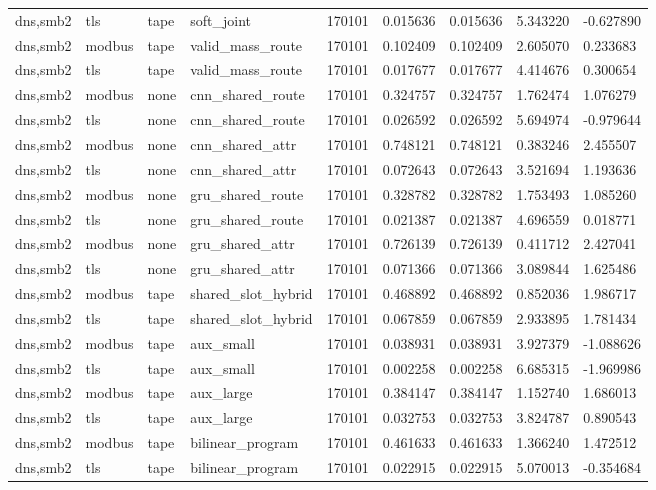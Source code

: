 \begin{tabular}{lllllllll}
dns,smb2 & tls & tape & soft\_joint & 170101 & 0.015636 & 0.015636 & 5.343220 & -0.627890 \\
dns,smb2 & modbus & tape & valid\_mass\_route & 170101 & 0.102409 & 0.102409 & 2.605070 & 0.233683 \\
dns,smb2 & tls & tape & valid\_mass\_route & 170101 & 0.017677 & 0.017677 & 4.414676 & 0.300654 \\
dns,smb2 & modbus & none & cnn\_shared\_route & 170101 & 0.324757 & 0.324757 & 1.762474 & 1.076279 \\
dns,smb2 & tls & none & cnn\_shared\_route & 170101 & 0.026592 & 0.026592 & 5.694974 & -0.979644 \\
dns,smb2 & modbus & none & cnn\_shared\_attr & 170101 & 0.748121 & 0.748121 & 0.383246 & 2.455507 \\
dns,smb2 & tls & none & cnn\_shared\_attr & 170101 & 0.072643 & 0.072643 & 3.521694 & 1.193636 \\
dns,smb2 & modbus & none & gru\_shared\_route & 170101 & 0.328782 & 0.328782 & 1.753493 & 1.085260 \\
dns,smb2 & tls & none & gru\_shared\_route & 170101 & 0.021387 & 0.021387 & 4.696559 & 0.018771 \\
dns,smb2 & modbus & none & gru\_shared\_attr & 170101 & 0.726139 & 0.726139 & 0.411712 & 2.427041 \\
dns,smb2 & tls & none & gru\_shared\_attr & 170101 & 0.071366 & 0.071366 & 3.089844 & 1.625486 \\
dns,smb2 & modbus & tape & shared\_slot\_hybrid & 170101 & 0.468892 & 0.468892 & 0.852036 & 1.986717 \\
dns,smb2 & tls & tape & shared\_slot\_hybrid & 170101 & 0.067859 & 0.067859 & 2.933895 & 1.781434 \\
dns,smb2 & modbus & tape & aux\_small & 170101 & 0.038931 & 0.038931 & 3.927379 & -1.088626 \\
dns,smb2 & tls & tape & aux\_small & 170101 & 0.002258 & 0.002258 & 6.685315 & -1.969986 \\
dns,smb2 & modbus & tape & aux\_large & 170101 & 0.384147 & 0.384147 & 1.152740 & 1.686013 \\
dns,smb2 & tls & tape & aux\_large & 170101 & 0.032753 & 0.032753 & 3.824787 & 0.890543 \\
dns,smb2 & modbus & tape & bilinear\_program & 170101 & 0.461633 & 0.461633 & 1.366240 & 1.472512 \\
dns,smb2 & tls & tape & bilinear\_program & 170101 & 0.022915 & 0.022915 & 5.070013 & -0.354684 \\

\end{tabular}
